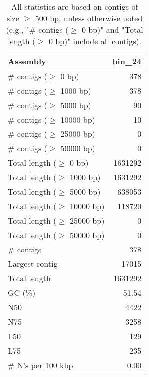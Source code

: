 \documentclass[12pt,a4paper]{article}
\begin{document}
\begin{table}[ht]
\begin{center}
\caption{All statistics are based on contigs of size $\geq$ 500 bp, unless otherwise noted (e.g., "\# contigs ($\geq$ 0 bp)" and "Total length ($\geq$ 0 bp)" include all contigs).}
\begin{tabular}{|l*{1}{|r}|}
\hline
Assembly & bin\_24 \\ \hline
\# contigs ($\geq$ 0 bp) & 378 \\ \hline
\# contigs ($\geq$ 1000 bp) & 378 \\ \hline
\# contigs ($\geq$ 5000 bp) & 90 \\ \hline
\# contigs ($\geq$ 10000 bp) & 10 \\ \hline
\# contigs ($\geq$ 25000 bp) & 0 \\ \hline
\# contigs ($\geq$ 50000 bp) & 0 \\ \hline
Total length ($\geq$ 0 bp) & 1631292 \\ \hline
Total length ($\geq$ 1000 bp) & 1631292 \\ \hline
Total length ($\geq$ 5000 bp) & 638053 \\ \hline
Total length ($\geq$ 10000 bp) & 118720 \\ \hline
Total length ($\geq$ 25000 bp) & 0 \\ \hline
Total length ($\geq$ 50000 bp) & 0 \\ \hline
\# contigs & 378 \\ \hline
Largest contig & 17015 \\ \hline
Total length & 1631292 \\ \hline
GC (\%) & 51.54 \\ \hline
N50 & 4422 \\ \hline
N75 & 3258 \\ \hline
L50 & 129 \\ \hline
L75 & 235 \\ \hline
\# N's per 100 kbp & 0.00 \\ \hline
\end{tabular}
\end{center}
\end{table}
\end{document}
